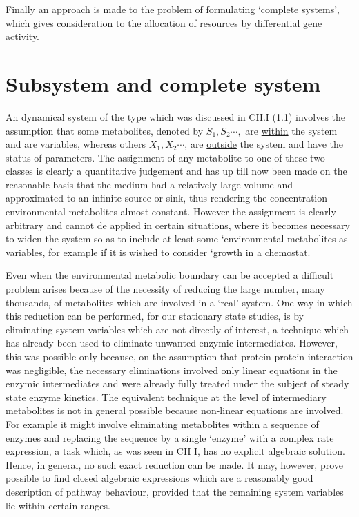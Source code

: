 Finally an approach is made to the problem of formulating `complete systems', which gives consideration to the allocation of resources by differential gene activity.

\section{Subsystem and complete system}

An dynamical system of the type which was discussed in CH.I (1.1) involves the assumption that some metabolites, denoted by $S_{1}, S_{2} \cdots,$ are \underline{within} the system and are variables, whereas others $X_{1}, X_{2} \cdots$, are \underline{outside} the system and have the status of parameters. The assignment of any metabolite to one of these two classes is clearly a quantitative judgement and has up till now been made on the reasonable basis that the medium had a relatively large volume and approximated to an infinite source or sink, thus rendering the concentration environmental metabolites almost constant. However the assignment is clearly arbitrary and cannot de applied in certain situations, where it becomes necessary to widen the system so as to include at least some `environmental metabolites as variables, for example if it is wished to consider `growth in a chemostat.

Even when the environmental metabolic boundary can be accepted a difficult problem arises because of the necessity of reducing the large number, many thousands, of metabolites which are involved in a `real' system. One way in which this reduction can be performed, for our stationary state studies, is by eliminating system variables which are not directly of interest, a technique which has already been used to eliminate unwanted enzymic intermediates. However, this was possible only because, on the assumption that protein-protein interaction was negligible, the necessary eliminations involved only linear equations in the enzymic intermediates and were already fully treated under the subject of steady state enzyme kinetics. The equivalent technique at the level of intermediary metabolites is not in general possible because non-linear equations are involved. For example it might involve eliminating metabolites within a sequence of enzymes and replacing the sequence by a single `enzyme' with a complex rate expression, a task which, as was seen in CH I, has no explicit algebraic solution. Hence, in general, no such exact reduction can be made. It may, however, prove possible to find closed algebraic expressions which are a reasonably good description of pathway behaviour, provided that the remaining system variables lie within certain ranges.

